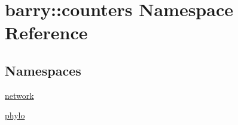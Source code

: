 \hypertarget{namespacebarry_1_1counters}{}\section{barry\+:\+:counters Namespace Reference}
\label{namespacebarry_1_1counters}
\subsection*{Namespaces}
\begin{DoxyCompactItemize}
\item 
 \hyperlink{namespacebarry_1_1counters_1_1network}{network}
\item 
 \hyperlink{namespacebarry_1_1counters_1_1phylo}{phylo}
\end{DoxyCompactItemize}
